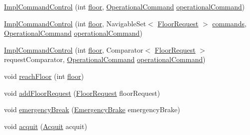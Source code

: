 \begin{DoxyCompactItemize}
\item 
\mbox{\hyperlink{classcontrol_1_1_impl_command_control_ae6bd16309a6cd954c9dd44244ed6cdd3}{Impl\+Command\+Control}} (int \mbox{\hyperlink{classcontrol_1_1_impl_command_control_acbd6195b1d21b55b2c9c96d144f98671}{floor}}, \mbox{\hyperlink{interfacecontrol_1_1_operational_command}{Operational\+Command}} \mbox{\hyperlink{classcontrol_1_1_impl_command_control_adbe2ee9057a11e4d2408947f5ff83cd5}{operational\+Command}})
\item 
\mbox{\hyperlink{classcontrol_1_1_impl_command_control_a57ac3479e6a08c522404266b3078db16}{Impl\+Command\+Control}} (int \mbox{\hyperlink{classcontrol_1_1_impl_command_control_acbd6195b1d21b55b2c9c96d144f98671}{floor}}, Navigable\+Set$<$ \mbox{\hyperlink{classcontrol_1_1command_1_1_floor_request}{Floor\+Request}} $>$ \mbox{\hyperlink{classcontrol_1_1_impl_command_control_afc3d3dfd36511a07dd41e717df3b13f9}{commands}}, \mbox{\hyperlink{interfacecontrol_1_1_operational_command}{Operational\+Command}} \mbox{\hyperlink{classcontrol_1_1_impl_command_control_adbe2ee9057a11e4d2408947f5ff83cd5}{operational\+Command}})
\item 
\mbox{\hyperlink{classcontrol_1_1_impl_command_control_a384f52aa39c3a5745b9143d6763e36a9}{Impl\+Command\+Control}} (int \mbox{\hyperlink{classcontrol_1_1_impl_command_control_acbd6195b1d21b55b2c9c96d144f98671}{floor}}, Comparator$<$ \mbox{\hyperlink{classcontrol_1_1command_1_1_floor_request}{Floor\+Request}} $>$ request\+Comparator, \mbox{\hyperlink{interfacecontrol_1_1_operational_command}{Operational\+Command}} \mbox{\hyperlink{classcontrol_1_1_impl_command_control_adbe2ee9057a11e4d2408947f5ff83cd5}{operational\+Command}})
\item 
void \mbox{\hyperlink{classcontrol_1_1_impl_command_control_a5736ac91cdc39805dc27c6af0c9935cb}{reach\+Floor}} (int \mbox{\hyperlink{classcontrol_1_1_impl_command_control_acbd6195b1d21b55b2c9c96d144f98671}{floor}})
\item 
void \mbox{\hyperlink{classcontrol_1_1_impl_command_control_a992b195b4521cba044f235fa35f6a9b2}{add\+Floor\+Request}} (\mbox{\hyperlink{classcontrol_1_1command_1_1_floor_request}{Floor\+Request}} floor\+Request)
\item 
void \mbox{\hyperlink{classcontrol_1_1_impl_command_control_a1a3e2202d967016c70f6c7e2105fc4c7}{emergency\+Break}} (\mbox{\hyperlink{classcontrol_1_1command_1_1_emergency_brake}{Emergency\+Brake}} emergency\+Brake)
\item 
void \mbox{\hyperlink{classcontrol_1_1_impl_command_control_a18ba4e8d7e7b6ebfec099c22f58d55d1}{acquit}} (\mbox{\hyperlink{classcontrol_1_1command_1_1_acquit}{Acquit}} acquit)

\end{DoxyCompactItemize}
